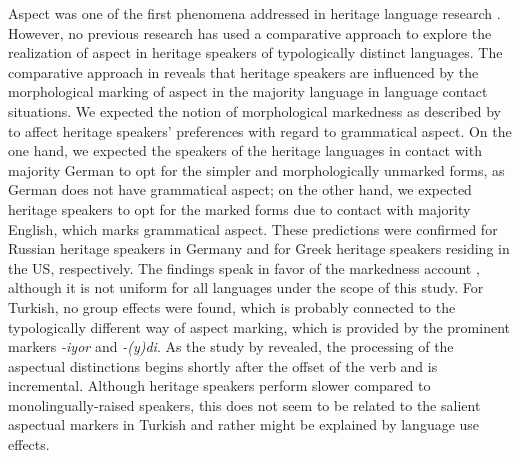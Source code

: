 \documentclass[output=paper,colorlinks,citecolor=brown]{langscibook}
\begin{document}
Aspect was one of the first phenomena addressed in heritage language research \parencite{montrul2002incomplete, kagan2005support,laleko2008compositional}. However, no previous research has used a comparative approach to explore the realization of aspect in heritage speakers of typologically distinct languages. The comparative approach in \textcite{RizouEtAl} reveals that heritage speakers are influenced by the morphological marking of aspect in the majority language in language contact situations. We expected the notion of morphological markedness as described by \textcite{comrie1976} to affect heritage speakers' preferences with regard to grammatical aspect. On the one hand, we expected the speakers of the heritage languages in contact with majority German to opt for the simpler and morphologically unmarked forms, as German does not have grammatical aspect; on the other hand, we expected heritage speakers to opt for the marked forms due to contact with majority English, which marks grammatical aspect.  
These predictions were confirmed for Russian heritage speakers in Germany and for Greek heritage speakers residing in the US, respectively. The findings speak in favor of the markedness account \parencite{comrie1976}, although it is not uniform for all languages under the scope of this study. For Turkish, no group effects were found, which is probably connected to the typologically different way of aspect marking, which is provided by the prominent markers \textit{-iyor} and \textit{-(y)di}. As the study by \textcite{Ozsoy_2023} revealed, the processing of the aspectual distinctions begins shortly after the offset of the verb and is incremental. Although heritage speakers perform slower compared to monolingually-raised speakers, this does not seem to be related to the salient aspectual markers in Turkish and rather might be explained by language use effects.
\end{document}

